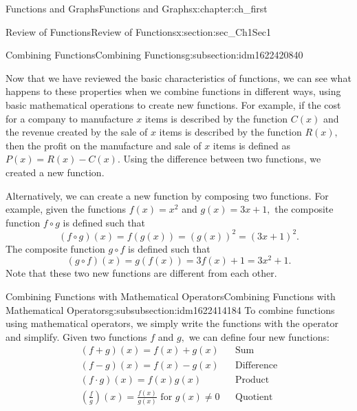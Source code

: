 \documentclass[oneside,10pt,]{book}
\numberwithin{equation}{section}
\newcommand{\amp}{&}
\begin{document}
\begin{chapterptx}{Functions and Graphs}{}{Functions and Graphs}{}{}{x:chapter:ch_first}
\begin{sectionptx}{Review of Functions}{}{Review of Functions}{}{}{x:section:sec_Ch1Sec1}
%
%
\typeout{************************************************}
\typeout{************************************************}
%
\begin{subsectionptx}{Combining Functions}{}{Combining Functions}{}{}{g:subsection:idm1622420840}
\begin{introduction}{}%
Now that we have reviewed the basic characteristics of functions, we can see what happens to these properties when we combine functions in different ways, using basic mathematical operations to create new functions. For example, if the cost for a company to manufacture \(x\) items is described by the function \(C(x)\) and the revenue created by the sale of \(x\) items is described by the function \(R(x),\) then the profit on the manufacture and sale of \(x\) items is defined as \(P(x)=R(x)-C(x).\) Using the difference between two functions, we created a new function.%
\par
Alternatively, we can create a new function by composing two functions. For example, given the functions \(f(x)=x^2\) and \(g(x)=3x+1,\) the composite function \(f\circ g\) is defined such that%
%
\begin{equation*}
(f\circ g)(x)=f(g(x))=(g(x))^2=(3x+1)^2.
\end{equation*}
The composite function \(g\circ f\) is defined such that%
%
\begin{equation*}
(g\circ f)(x)=g(f(x))=3f(x)+1=3x^2+1.
\end{equation*}
Note that these two new functions are different from each other.%
\end{introduction}%
%
%
\typeout{************************************************}
\typeout{************************************************}
%
\begin{subsubsectionptx}{Combining Functions with Mathematical Operators}{}{Combining Functions with Mathematical Operators}{}{}{g:subsubsection:idm1622414184}
To combine functions using mathematical operators, we simply write the functions with the operator and simplify. Given two functions \(f\) and \(g,\) we can define four new functions:%
%
\begin{align*}
(f+g)(x)=f(x)+g(x) \amp \amp \text{Sum} \\
(f-g)(x)=f(x)-g(x) \amp \amp \text{Difference} \\
(f·g)(x)=f(x)g(x) \amp \amp \text{Product} \\
\left(\frac{f}{g}\right)(x)=\frac{f(x)}{g(x)} \text{ for } g(x) \neq 0 \amp \amp \text{Quotient} 

\end{align*}
\end{subsubsectionptx}
\end{subsectionptx}
\end{sectionptx}
\end{chapterptx}
\end{document}
